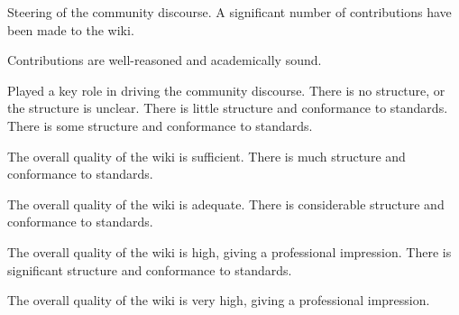 \documentclass{../../fal_assignment}
\begin{document}
\begin{markingrubric}
        \par		Steering of the community discourse.
        \grade 		A significant number of contributions have been made to the wiki.
        \par		Contributions are well-reasoned and academically sound.
        \par		Played a key role in driving the community discourse.
%
        \grade\fail 	There is no structure, or the structure is unclear.
        \grade 		There is little structure and conformance to standards.
        \grade 		There is some structure and conformance to standards.
        \par 		The overall quality of the wiki is sufficient.
        \grade 		There is much structure and conformance to standards.
        \par 		The overall quality of the wiki is adequate.
        \grade 		There is considerable structure and conformance to standards.
        \par 		The overall quality of the wiki is high, giving a professional impression.
        \grade 		There is significant structure and conformance to standards.
        \par 		The overall quality of the wiki is very high, giving a professional impression.
\end{markingrubric}
\end{document}

